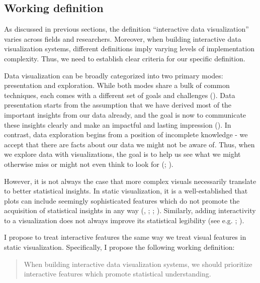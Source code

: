 \documentclass[
]{book}
\theoremstyle{definition}
\theoremstyle{definition}
\theoremstyle{definition}
\theoremstyle{definition}
\theoremstyle{remark}
\begin{document}
\subsection{Working definition}\label{working-definition}

As discussed in previous sections, the definition ``interactive data visualization'' varies across fields and researchers. Moreover, when building interactive data visualization systems, different definitions imply varying levels of implementation complexity. Thus, we need to establish clear criteria for our specific definition.

Data visualization can be broadly categorized into two primary modes: presentation and exploration. While both modes share a bulk of common techniques, each comes with a different set of goals and challenges (). Data presentation starts from the assumption that we have derived most of the important insights from our data already, and the goal is now to communicate these insights clearly and make an impactful and lasting impression (). In contrast, data exploration begins from a position of incomplete knowledge - we accept that there are facts about our data we might not be aware of. Thus, when we explore data with visualizations, the goal is to help us see what we might otherwise miss or might not even think to look for (; ).

However, it is not always the case that more complex visuals necessarily translate to better statistical insights. In static visualization, it is a well-established that plots can include seemingly sophisticated features which do not promote the acquisition of statistical insights in any way (, ; ; ). Similarly, adding interactivity to a visualization does not always improve its statistical legibility (see e.g. ; ).

I propose to treat interactive features the same way we treat visual features in static visualization. Specifically, I propose the following working definition:

\begin{quote}
When building interactive data visualization systems, we should prioritize interactive features which promote statistical understanding.
\end{quote}
\end{document}
